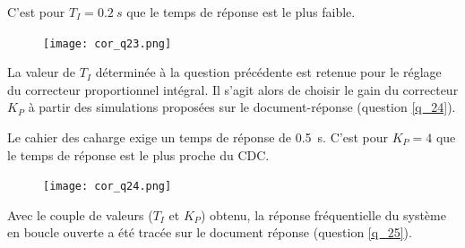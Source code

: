 \ifprof
\begin{corrige}
C'est pour $T_I = \SI{0,2}{s}$ que le temps de réponse est le plus faible. 
\begin{figure}[H]
\centering
\texttt{[image: cor\_q23.png]}
\end{figure}
\end{corrige}
\else
\fi


La valeur de $T_I$ déterminée à la question précédente est retenue pour le réglage du correcteur proportionnel intégral. Il s’agit alors de choisir le gain du correcteur $K_P$ à partir des simulations proposées sur le document-réponse (question \ref{q_24}).

\ifprof
\begin{corrige}
Le cahier des caharge exige un temps de réponse de \SI{0,5}{s}. C'est pour $K_P = 4$ que le temps de réponse est le plus proche du CDC. 
\begin{figure}[H]
\centering
\texttt{[image: cor\_q24.png]}
\end{figure}


\end{corrige}
\else
\fi


Avec le couple de valeurs ($T_I$ et $K_P$) obtenu, la réponse fréquentielle du système en boucle ouverte a été tracée sur le document réponse (question \ref{q_25}).

